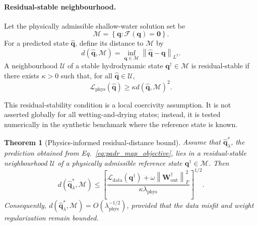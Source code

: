 \documentclass[pdflatex,sn-mathphys-ay]{sn-jnl}
\theoremstyle{thmstyleone}
\newtheorem{theorem}{Theorem}
\begin{document}
\paragraph{Residual-stable neighbourhood.}
Let the physically admissible shallow-water solution set be
\begin{equation}
  \mathcal{M}
  =
  \left\{
    \mathbf{q}:
    \mathcal{F}
    \left(
      \mathbf{q}
    \right)
    =
    \mathbf{0}
  \right\}.
  \label{eq:padr_physical_manifold}
\end{equation}
For a predicted state $\hat{\mathbf{q}}$, define its distance to
$\mathcal{M}$ by
\begin{equation}
  d
  \left(
    \hat{\mathbf{q}},
    \mathcal{M}
  \right)
  =
  \inf_{\mathbf{q}\in\mathcal{M}}
  \left\|
    \hat{\mathbf{q}}
    -
    \mathbf{q}
  \right\|_{L^{2}}.
  \label{eq:padr_residual_distance}
\end{equation}
A neighbourhood $\mathcal{U}$ of a stable hydrodynamic state
$\mathbf{q}^{\dagger}\in\mathcal{M}$ is residual-stable if there
exists $\kappa>0$ such that, for all
$\hat{\mathbf{q}}\in\mathcal{U}$,
\begin{equation}
  \mathcal{L}_{\mathrm{phys}}
  \left(
    \hat{\mathbf{q}}
  \right)
  \geq
  \kappa
  d
  \left(
    \hat{\mathbf{q}},
    \mathcal{M}
  \right)^2.
  \label{eq:padr_residual_stability}
\end{equation}

This residual-stability condition is a local coercivity assumption.  It
is not asserted globally for all wetting-and-drying states; instead, it
is tested numerically in the synthetic benchmark where the reference
state is known.

\begin{theorem}[Physics-informed residual-distance bound]
\label{thm:error_bound}
Assume that $\hat{\mathbf{q}}^{*}_{\lambda}$, the prediction obtained
from Eq.~\eqref{eq:padr_map_objective}, lies in a residual-stable
neighbourhood $\mathcal{U}$ of a physically admissible reference state
$\mathbf{q}^{\dagger}\in\mathcal{M}$.  Then
\begin{equation}
  d
  \left(
    \hat{\mathbf{q}}^{*}_{\lambda},
    \mathcal{M}
  \right)
  \leq
  \left[
  \frac{
    \mathcal{L}_{\mathrm{data}}
    \left(
      \mathbf{q}^{\dagger}
    \right)
    +
    \omega
    \left\|
      \mathbf{W}^{\dagger}_{\mathrm{out}}
    \right\|_{F}^{2}
  }{
    \kappa
    \lambda_{\mathrm{phys}}
  }
  \right]^{1/2}.
  \label{eq:padr_distance_rate}
\end{equation}
Consequently,
$d(\hat{\mathbf{q}}^{*}_{\lambda},\mathcal{M})
=O(\lambda_{\mathrm{phys}}^{-1/2})$, provided that the data misfit and
weight regularization remain bounded.
\end{theorem}
\end{document}
